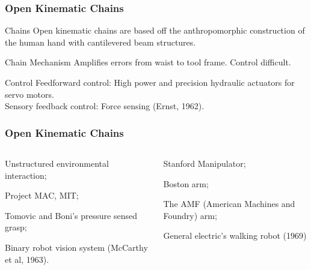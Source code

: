 \begin{frame}
	\frametitle{Open Kinematic Chains}
	\begin{block}{Chains}
		Open kinematic chains are based off the anthropomorphic construction of the human hand with cantilevered beam structures.
	\end{block}
	\begin{block}{Chain Mechanism}
		 Amplifies errors from waist to tool frame. Control difficult. 
	\end{block}
	\begin{block}{Control}
		Feedforward control: High power and precision hydraulic actuators for servo motors. \\
		Sensory feedback control: Force sensing (Ernst, 1962). 
	\end{block}
\end{frame}


\begin{frame}
	\frametitle{Open Kinematic Chains}
	\begin{columns}[t]
		\begin{column}{.5\columnwidth}
			\begin{description}
				\item Unstructured environmental interaction;
				\item Project MAC, MIT;
				\item Tomovic and Boni's pressure sensed grasp;
				\item Binary robot vision system (McCarthy et al, 1963).
			\end{description}
		\end{column}
	\begin{column}{.5\columnwidth}
	\begin{description}
		\item Stanford Manipulator;
		\item Boston arm;
		\item The AMF (American Machines and Foundry) arm;
		\item General electric's walking robot (1969)
		\end{description}
\end{column}
	\end{columns}
\end{frame}